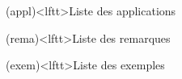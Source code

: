 \documentclass[../../main/main.tex]{subfiles}
\begin{document}
\begin{boxes}
	\begin{tcb}(appl)<lftt>{Liste des applications}
	\end{tcb}
	\begin{tcb}(rema)<lftt>{Liste des remarques}
	\end{tcb}
	\begin{tcb}(exem)<lftt>{Liste des exemples}
	\end{tcb}

\end{boxes}
\end{document}

